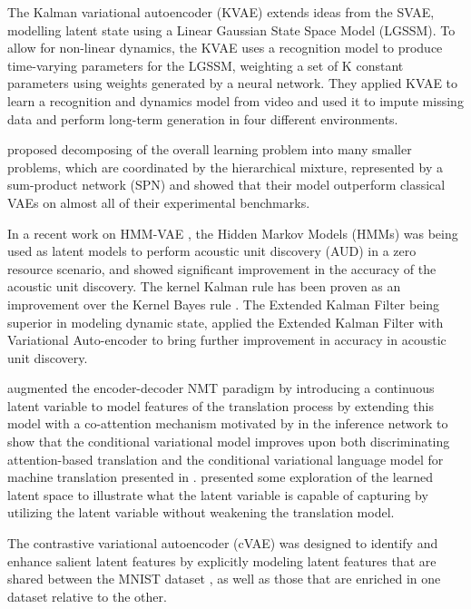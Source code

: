 \documentclass{article}
\begin{document}
The Kalman variational autoencoder (KVAE) \cite{nipsFraccaroKPW17} extends ideas from the SVAE, modelling latent state using a Linear Gaussian State Space Model (LGSSM). To allow for non-linear dynamics, the KVAE uses a recognition model to produce time-varying parameters for the LGSSM, weighting a set of K constant parameters using weights generated by a neural network. They applied KVAE to learn a recognition and dynamics model from video and used it to impute missing data and perform long-term generation in four different environments.  

\cite{pmlr-v97-tan19b} proposed decomposing of the overall learning problem into many smaller problems, which are coordinated by the hierarchical mixture, represented by a sum-product network (SPN) and showed that their model outperform classical VAEs on almost all of their experimental benchmarks.

In a recent work on HMM-VAE \cite{Raj_2017}, the Hidden Markov Models (HMMs) was being used as latent models to perform acoustic unit discovery (AUD) in a zero resource scenario, and showed significant improvement in the accuracy of the acoustic unit discovery. The kernel Kalman rule has been proven as an improvement over the Kernel Bayes rule \cite{Gebhardt2017}. The Extended Kalman Filter being superior in modeling dynamic state, applied the Extended Kalman Filter with Variational Auto-encoder to bring further improvement in accuracy in acoustic unit discovery. 

\par
\cite{pagnoni2018conditional} augmented the encoder-decoder NMT paradigm by introducing a continuous latent variable to model features of the translation process by extending this model with a co-attention mechanism motivated by \cite{parikh2016} in the inference network to show that the conditional variational model improves upon both discriminating attention-based translation and the conditional variational language model for machine translation presented in \cite{zhang2016}. \cite{pagnoni2018conditional} presented some exploration of the learned latent space to illustrate what the latent variable is capable of capturing by utilizing the latent variable without weakening the translation model.

\par
The contrastive variational autoencoder (cVAE) \cite{abid2019contrastive} was designed to identify and enhance salient latent features by explicitly modeling latent features that are shared between the MNIST dataset \cite{lecun-mnisthandwrittendigit-2010}, as well as those that are enriched in one dataset relative to the other.
\end{document}
